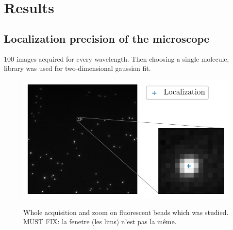 \section{Results}
\subsection{Localization precision of the microscope}
100 images acquired for every wavelength.
Then choosing a single molecule,  library was used for two-dimensional gaussian fit.

\begin{figure}[htbp]
    \centering
    \includegraphics[scale=1]{figures/beads_inset_zoom.pdf}
    \label{fig:beads_inset_zoom}
    \caption{Whole acquisition and zoom on fluorescent beads which was studied. MUST FIX: la fenetre (les lims) n'est pas la même.}
\end{figure}


